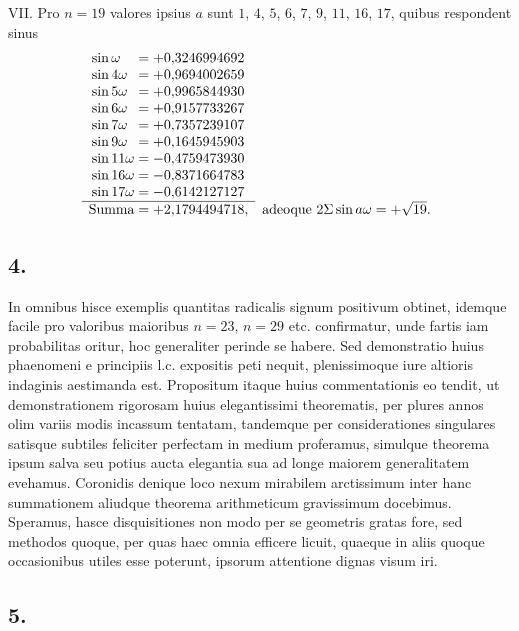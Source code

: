\documentclass[twoside,12pt]{memoir}
\begin{document}
VII. Pro \(n=19\) valores ipsius \(a\) sunt \(1\), \(4\), \(5\), \(6\), \(7\), \(9\), \(11\), \(16\), \(17\), quibus respondent sinus
\[\begin{array}{rl}
 \sin \omega\phantom{11}=+0{,}3246994692 \phantom{,}&\\
 \sin 4 \omega\phantom{1}=+0{,}9694002659 \phantom{,}&\\
 \sin 5 \omega\phantom{1}=+0{,}9965844930 \phantom{,}&\\
\sin 6 \omega\phantom{1}=+0{,}9157733267 \phantom{,}&\\
 \sin 7 \omega\phantom{1}=+0{,}7357239107 \phantom{,}&\\
 \sin 9 \omega\phantom{1}=+0{,}1645945903 \phantom{,}&\\
 \sin 11 \omega=-0{,}4759473930 \phantom{,}&\\
 \sin 16 \omega=-0{,}8371664783 \phantom{,}&\\
 \sin 17 \omega=-0{,}6142127127 \phantom{,}&\\ 
 \cline{1-1} \text{Summa}=+2{,}1794494718,&\text{adeoque } 2 \Sigma \sin a \omega=+\sqrt{19}.
\end{array}\]\pagebreak%

\subsection*{4.}
 
In omnibus hisce exemplis quantitas radicalis signum positivum obtinet, idemque facile pro valoribus maioribus \(n=23\), \(n=29\) etc. confirmatur, unde fartis iam probabilitas oritur, hoc generaliter perinde se habere. Sed demonstratio huius phaenomeni e principiis l.c. expositis peti nequit, plenissimoque iure altioris indaginis aestimanda est. Propositum itaque huius commentationis eo tendit, ut demonstrationem rigorosam huius elegantissimi theorematis, per plures annos olim variis modis incassum tentatam, tandemque per considerationes singulares satisque subtiles feliciter perfectam in medium proferamus, simulque theorema ipsum salva seu potius aucta elegantia sua ad longe maiorem generalitatem evehamus. Coronidis denique loco nexum mirabilem arctissimum inter hanc summationem aliudque theorema arithmeticum gravissimum docebimus. Speramus, hasce disquisitiones non modo per se geometris gratas fore, sed methodos quoque, per quas haec omnia efficere licuit, quaeque in aliis quoque occasionibus utiles esse poterunt, ipsorum attentione dignas visum iri.

\subsection*{5.}
 
\end{document}
